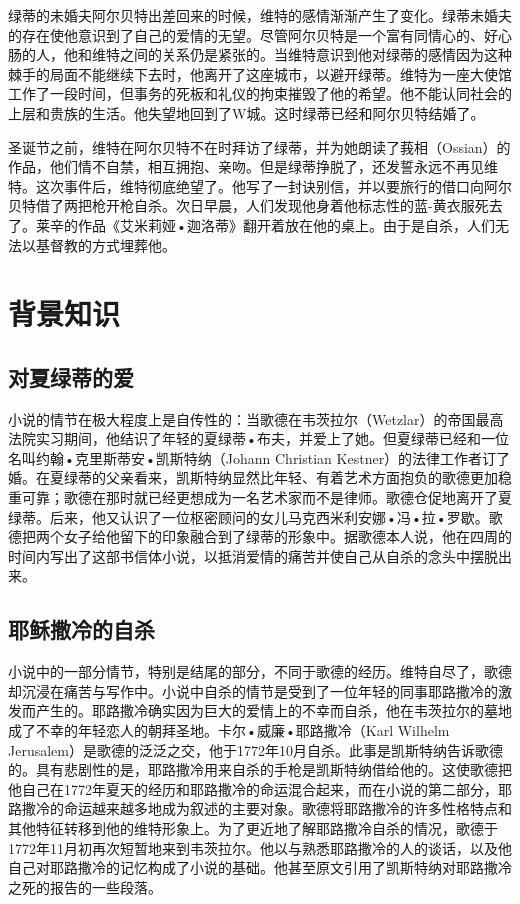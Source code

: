 \documentclass[12pt,oneside]{book}
\begin{document}
绿蒂的未婚夫阿尔贝特出差回来的时候，维特的感情渐渐产生了变化。绿蒂未婚夫的存在使他意识到了自己的爱情的无望。尽管阿尔贝特是一个富有同情心的、好心肠的人，他和维特之间的关系仍是紧张的。当维特意识到他对绿蒂的感情因为这种棘手的局面不能继续下去时，他离开了这座城市，以避开绿蒂。维特为一座大使馆工作了一段时间，但事务的死板和礼仪的拘束摧毁了他的希望。他不能认同社会的上层和贵族的生活。他失望地回到了W城。这时绿蒂已经和阿尔贝特结婚了。

圣诞节之前，维特在阿尔贝特不在时拜访了绿蒂，并为她朗读了莪相（Ossian）的作品，他们情不自禁，相互拥抱、亲吻。但是绿蒂挣脱了，还发誓永远不再见维特。这次事件后，维特彻底绝望了。他写了一封诀别信，并以要旅行的借口向阿尔贝特借了两把枪开枪自杀。次日早晨，人们发现他身着他标志性的蓝-黄衣服死去了。莱辛的作品《艾米莉娅•迦洛蒂》翻开着放在他的桌上。由于是自杀，人们无法以基督教的方式埋葬他。


\chapter{背景知识}
\label{sec-6-2}
\section{对夏绿蒂的爱}
\label{sec-6-2-1}
小说的情节在极大程度上是自传性的：当歌德在韦茨拉尔（Wetzlar）的帝国最高法院实习期间，他结识了年轻的夏绿蒂•布夫，并爱上了她。但夏绿蒂已经和一位名叫约翰•克里斯蒂安•凯斯特纳（Johann Christian Kestner）的法律工作者订了婚。在夏绿蒂的父亲看来，凯斯特纳显然比年轻、有着艺术方面抱负的歌德更加稳重可靠；歌德在那时就已经更想成为一名艺术家而不是律师。歌德仓促地离开了夏绿蒂。后来，他又认识了一位枢密顾问的女儿马克西米利安娜•冯•拉•罗歇。歌德把两个女子给他留下的印象融合到了绿蒂的形象中。据歌德本人说，他在四周的时间内写出了这部书信体小说，以抵消爱情的痛苦并使自己从自杀的念头中摆脱出来。


\section{耶稣撒冷的自杀}
\label{sec-6-2-2}
小说中的一部分情节，特别是结尾的部分，不同于歌德的经历。维特自尽了，歌德却沉浸在痛苦与写作中。小说中自杀的情节是受到了一位年轻的同事耶路撒冷的激发而产生的。耶路撒冷确实因为巨大的爱情上的不幸而自杀，他在韦茨拉尔的墓地成了不幸的年轻恋人的朝拜圣地。卡尔•威廉•耶路撒冷（Karl Wilhelm Jerusalem）是歌德的泛泛之交，他于1772年10月自杀。此事是凯斯特纳告诉歌德的。具有悲剧性的是，耶路撒冷用来自杀的手枪是凯斯特纳借给他的。这使歌德把他自己在1772年夏天的经历和耶路撒冷的命运混合起来，而在小说的第二部分，耶路撒冷的命运越来越多地成为叙述的主要对象。歌德将耶路撒冷的许多性格特点和其他特征转移到他的维特形象上。为了更近地了解耶路撒冷自杀的情况，歌德于1772年11月初再次短暂地来到韦茨拉尔。他以与熟悉耶路撒冷的人的谈话，以及他自己对耶路撒冷的记忆构成了小说的基础。他甚至原文引用了凯斯特纳对耶路撒冷之死的报告的一些段落。
\end{document}
